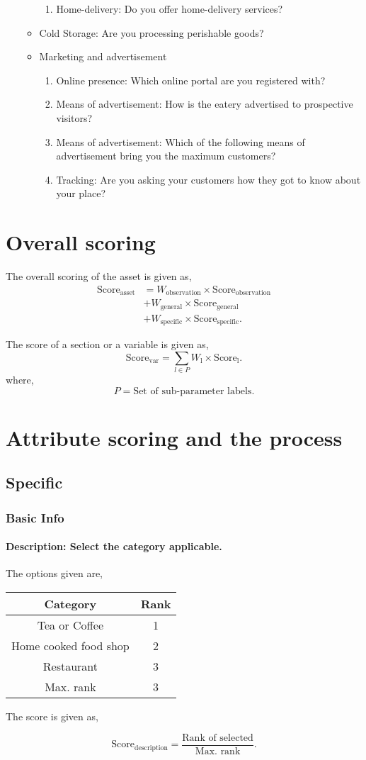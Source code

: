 \documentclass[oneside,twocolumn]{article}
\newcommand{\tsub}[2]{\text{#1}_{\text{#2}}}
\newcommand{\tsubb}[2]{#1_{\text{#2}}}
\newcommand{\dsub}[2]{\dfrac{\text{#1}}{\text{#2}}}
\newcommand{\singsel}[1]
{
	\[
		\tsub{Score}{#1} = \dsub{Rank of selected}{Max. rank}.
	\]
}
\newenvironment{ttable}
{
\begin{center}
\begin{tabular}{c|c}
\hline
}
{
\\ \hline
\end{tabular}
\end{center}
}
\begin{document}
\begin{itemize}
\begin{itemize}
				\begin{enumerate}
					\item Home-delivery: Do you offer home-delivery services?
				\end{enumerate}
			\item Cold Storage: Are you processing perishable goods?
			\item Marketing and advertisement
				\begin{enumerate}
					\item Online presence: Which online portal are you registered with?
					\item Means of advertisement: How is the eatery advertised to prospective visitors?
					\item Means of advertisement: Which of the following means of advertisement bring you the maximum customers?
					\item Tracking: Are you asking your customers how they got to know about your place?
				\end{enumerate}
		\end{itemize}
\end{itemize}
\section{Overall scoring}
The overall scoring of the asset is given as,
\begin{align*}
	\tsub{Score}{asset} &= \tsubb{W}{observation} \times \tsub{Score}{observation} \\
	&+ \tsubb{W}{general} \times \tsub{Score}{general} \\
	&+ \tsubb{W}{specific} \times \tsub{Score}{specific}.
\end{align*}

The score of a section or a variable is given as,
\[
	\tsub{Score}{var} = \sum_{l \in P} \tsubb{W}{l} \times \tsub{Score}{l}.
\]
where,
\[
	P = \text{Set of sub-parameter labels.}
\]	
\section{Attribute scoring and the process}
\subsection{Specific}
\subsubsection{Basic Info}
\paragraph{Description: Select the category applicable.}
The options given are,
\begin{ttable}
	Category & Rank \\ \hline
	Tea or Coffee & 1 \\
	Home cooked food shop & 2 \\
	Restaurant & 3 \\ \hline
	Max. rank & 3
\end{ttable}
The score is given as,
\singsel{description}
\end{document}
